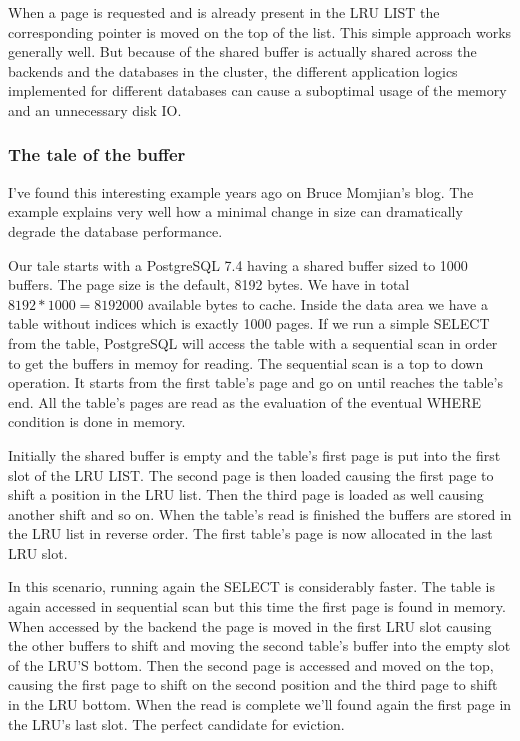 When a page is requested and is already present in the LRU LIST the corresponding pointer is moved on the top of the list. 
This simple approach works generally well. But because of the shared buffer is actually shared across the backends and the databases in the cluster, the different application logics
implemented for different databases can cause a suboptimal usage of the memory and an unnecessary disk IO. 

\subsubsection{The tale of the buffer}
I've found this interesting example years ago on Bruce Momjian's blog. The example explains very well how a 
minimal change in size can dramatically degrade the database performance.\newline

Our tale starts with a PostgreSQL 7.4 having a shared buffer sized to 1000 buffers. The page size is the default, 8192 bytes. 
We have in total \begin{math}8192 * 1000 = 8192000\end{math} available bytes to cache. 
Inside the data area we have a table without indices which is exactly 1000 pages. If we run a simple SELECT from the table,
PostgreSQL  will access the table with a sequential scan in order to get the buffers in memoy for reading. 
The sequential scan is a top to down operation. It starts from the first table's page and go on until reaches
the table's end. All the table's pages are read as the evaluation of the eventual WHERE condition is done in memory.

Initially the shared buffer is empty and the table's first page is put into the first slot of the LRU LIST.
The second page is then loaded causing the first page to shift a position in the LRU list. Then the third page is loaded as well causing another shift and so on.
When the table's read is finished the buffers are stored in the LRU list in reverse order. The first table's page is now allocated in the last LRU slot.

In this scenario, running again the SELECT is considerably faster. The table is again accessed in sequential scan but this time the first page is found in memory.
When accessed by the backend the page is moved in the first LRU slot causing the other buffers to shift and moving the second table's buffer into the empty slot of the LRU'S bottom.
Then the second page is accessed and moved on the top, causing the first page to shift on the second position and the third page to shift in the LRU bottom.
When the read is complete we'll found again the first page in the LRU's last slot. The perfect candidate for eviction.

